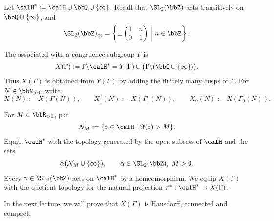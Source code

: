 Let $\calH^* := \calH \cup \bbQ \cup \{\infty\}$. Recall that $\SL_2(\bbZ)$ acts transitively on $\bbQ \cup \{\infty\}$, and
\[
    \SL_2(\bbZ)_\infty = \left\{\pm\begin{pmatrix}1 & n\\ 0 & 1\end{pmatrix} \ \middle|\ n \in \bbZ\right\}.
\]

\begin{definition}\label{Def:MF_compact_modular_curve}
    The  associated with a congruence subgroup $\Gamma$ is
    \[
        X(\Gamma) := \Gamma \backslash \calH^* = Y(\Gamma) \cup \bigl(\Gamma \backslash (\bbQ \cup \{\infty\})\bigr).
    \]
    Thus $X(\Gamma)$ is obtained from $Y(\Gamma)$ by adding the finitely many cusps of $\Gamma$. For $N \in \bbN_{>0}$, write
    \[
        X(N) := X(\Gamma(N)), \qquad X_1(N) := X(\Gamma_1(N)), \qquad X_0(N) := X(\Gamma_0(N)).
    \]
\end{definition}

For $M \in \bbR_{>0}$, put
\[
    \mathcal{N}_M := \{z \in \calH \mid \Im(z) > M\}.
\]
Equip $\calH^*$ with the topology generated by the open subsets of $\calH$ and the sets
\[
    \alpha\bigl(\mathcal{N}_M \cup \{\infty\}\bigr), \qquad \alpha \in \SL_2(\bbZ),\ M > 0.
\]
Every $\gamma \in \SL_2(\bbZ)$ acts on $\calH^*$ by a homeomorphism. We equip $X(\Gamma)$ with the quotient topology for the natural projection $\pi^* : \calH^* \to X(\Gamma)$.

\begin{remarkstar}
    In the next lecture, we will prove that $X(\Gamma)$ is Hausdorff, connected and compact.
\end{remarkstar}
